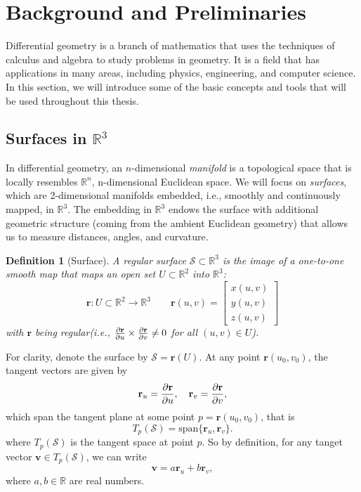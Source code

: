 \documentclass[12pt]{article}
\newcommand{\R}{\mathbb{R}}
\newtheorem{definition}{Definition}[section]
\begin{document}
\section{Background and Preliminaries}

Differential geometry is a branch of mathematics that uses the techniques of calculus and algebra to study problems in geometry. 
It is a field that has applications in many areas, including physics, engineering, and computer science.
In this section, we will introduce some of the basic concepts and tools that will be used throughout this thesis. 

\subsection{Surfaces in \texorpdfstring{$\mathbb{R}^3$}{R3}}\label{sec:surface-def}

In differential geometry, an $n$-dimensional \emph{manifold} is a topological space that is locally resembles $\mathbb{R}^n$, n-dimensional Euclidean space. 
We will focus on \emph{surfaces}, which are 2-dimensional manifolds embedded, i.e., smoothly and continuously mapped, in $\mathbb{R}^3$.
The embedding in $\mathbb{R}^3$ endows the surface with additional geometric structure (coming from the ambient Euclidean geometry) that allows us to measure distances, angles, and curvature.

\begin{definition}[Surface]\label{def:surface}
	A regular surface $\mathcal{S}\subset\R^3$ is the image of a one-to-one smooth map that maps an open set $U\subset\R^{2}$ into $\R^3$:
	\begin{equation}\label{eq:surface-param}		
		\mathbf{r}: U\subset\R^{2}\to\R^3 \qquad \mathbf{r}(u,v) = \begin{bmatrix}
			x(u,v)\\[1ex]
			y(u,v)\\[1ex]
			z(u,v)
		\end{bmatrix}
	\end{equation}
	with $\mathbf{r}$ being regular(i.e., $\pdv{\mathbf{r}}{u} \times \pdv{\mathbf{r}}{v} \neq 0$ for all $(u,v)\in U$).
\end{definition}

For clarity, denote the surface by $\mathcal{S}=\mathbf{r}(U)$. At any point $\mathbf{r}(u_0,v_0)$, the tangent vectors are given by
\[
\mathbf{r}_u = \pdv{\mathbf{r}}{u}, \quad \mathbf{r}_v = \pdv{\mathbf{r}}{v},
\]
which span the tangent plane at some point $p = \mathbf{r}(u_0,v_0)$, that is 
\[
T_{p}(\mathcal{S}) = \text{span}\{\mathbf{r}_u,\mathbf{r}_v\}.
\]
where $T_{p}(\mathcal{S})$ is the tangent space at point $p$.
So by definition, for any tanget vector $\mathbf{v}\in T_{p}(\mathcal{S})$, we can write
\[
\mathbf{v} = a\mathbf{r}_u + b\mathbf{r}_v,
\]
where $a,b\in\R$ are real numbers.
\end{document}
